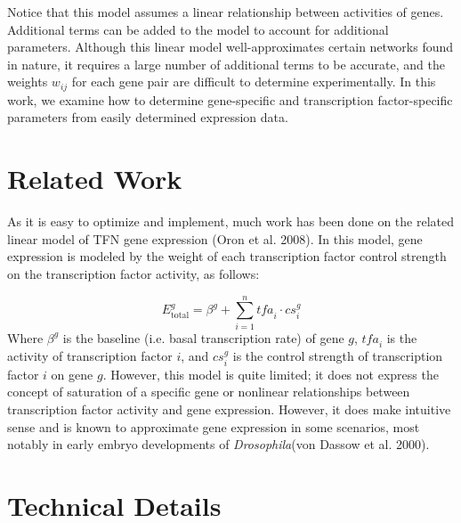 \documentclass[paper=a4, fontsize=11pt]{scrartcl} %
\newcommand{\tfa}{\textit{tfa}}
\newcommand{\cs}{\textit{cs}}
\begin{document}
Notice that this model assumes a linear relationship between activities of genes. Additional terms can be added to the model to account for additional parameters. Although this linear model well-approximates certain networks found in nature, it requires a large number of additional terms to be accurate, and the weights $w_{ij}$ for each gene pair are difficult to determine experimentally. In this work, we examine how to determine gene-specific and transcription factor-specific parameters from easily determined expression data.

\section{Related Work}
As it is easy to optimize and implement, much work has been done on the related linear model of TFN gene expression (Oron et al. 2008). In this model, gene expression is modeled by the weight of each transcription factor control strength on the transcription factor activity, as follows:

\[E^g_\text{total} = \beta^g + \sum_{i=1}^n{\tfa_i \cdot \cs_i^g} \]
Where $\beta^g$ is the baseline (i.e. basal transcription rate) of gene $g$, $\tfa_i$ is the activity of transcription factor $i$, and $\cs_i^g$ is the control strength of transcription factor $i$ on gene $g$. However, this model is quite limited; it does not express the concept of saturation of a specific gene or nonlinear relationships between transcription factor activity and gene expression. However, it does make intuitive sense and is known to approximate gene expression in some scenarios, most notably in early embryo developments of \textit{Drosophila}(von Dassow et al. 2000).

\section{Technical Details}
\end{document}
